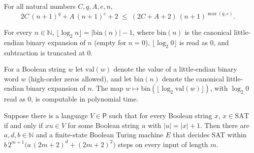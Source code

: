 \begin{theorem}
\label{Complexity.ladner_composition_clock}
\leanok
{}
For all natural numbers $C,q,A,e,n$,
\[
  2C\,(n+1)^q+A\,(n+1)^e+2\;\le\;(2C+A+2)\,(n+1)^{\max(q,e)}.
\]
\end{theorem}

\begin{theorem}
\label{Complexity.ladner_log_eq_bits_length}
\leanok
{}
For every $n\in\mathbb N$, $\lfloor\log_2 n\rfloor=|\mathrm{bin}(n)|-1$, where $\mathrm{bin}(n)$
is the canonical little-endian binary expansion of $n$ (empty for $n=0$), $\lfloor\log_2 0\rfloor$
is read as $0$, and subtraction is truncated at $0$.
\end{theorem}

\begin{theorem}
\label{Complexity.ladner_binary_log_FP}
\leanok
{}
For a Boolean string $w$ let $\mathrm{val}(w)$ denote the value of a little-endian binary word $w$ (high-order zeros allowed), and let $\mathrm{bin}(n)$ denote the canonical little-endian binary expansion of $n$. The map
$w\mapsto\mathrm{bin}(\lfloor\log_2\mathrm{val}(w)\rfloor)$, with $\log_2 0$ read as $0$, is
computable in polynomial time.
\end{theorem}

\begin{theorem}
\label{Complexity.ladner_short_SAT_machine}
\leanok
{}
Suppose there is a language $V\in\mathsf P$ such that for every Boolean string $x$, $x\in\mathrm{SAT}$ if and only if $xu\in V$ for some Boolean string $u$ with $|u|=|x|+1$. Then there are $a,d,b\in\mathbb N$ and a finite-state Boolean Turing machine $E$ that
decides SAT within $b\,2^{m+1}\bigl(a\,(2m+2)^d+(2m+2)^2\bigr)$ steps on every input of length
$m$.
\end{theorem}

